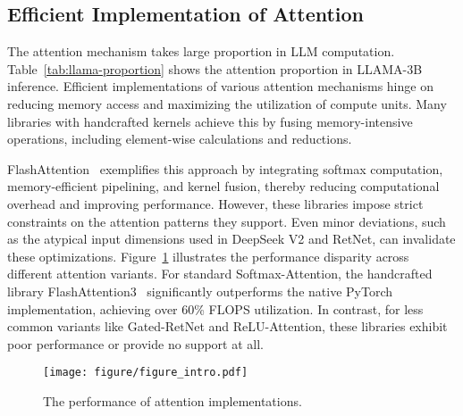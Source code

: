 \begin{table}[t]
  \centering
  \caption{Attention proportion in LLAMA-3B inference}
  \vspace{-5mm}
  \label{tab:llama-proportion}%
\end{table}%


\subsection{Efficient Implementation of Attention}
The attention mechanism takes large proportion in LLM computation. Table~\ref{tab:llama-proportion} shows the attention proportion in LLAMA-3B inference.
Efficient implementations of various attention mechanisms hinge on reducing memory access and maximizing the utilization of compute units. Many libraries with handcrafted kernels achieve this by fusing memory-intensive operations, including element-wise calculations and reductions.

FlashAttention~\cite{shah2024flashattention} exemplifies this approach by integrating softmax computation, memory-efficient pipelining, and kernel fusion, thereby reducing computational overhead and improving performance. However, these libraries impose strict constraints on the attention patterns they support. Even minor deviations, such as the atypical input dimensions used in DeepSeek V2 and RetNet, can invalidate these optimizations. Figure~\ref{fig:torch-vs-handcraft} illustrates the performance disparity across different attention variants. For standard Softmax-Attention, the handcrafted library FlashAttention3~\cite{shah2024flashattention} significantly outperforms the native PyTorch implementation, achieving over 60\% FLOPS utilization. In contrast, for less common variants like Gated-RetNet and ReLU-Attention, these libraries exhibit poor performance or provide no support at all.


\begin{figure}[t]
    \centering
    \texttt{[image: figure/figure\_intro.pdf]}
    \vspace{-0.7cm}
    \caption{The performance of attention implementations.}
  \vspace{-5mm}
    \label{fig:torch-vs-handcraft}
\end{figure}

